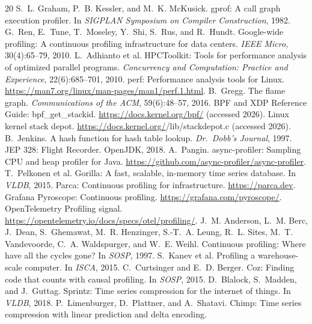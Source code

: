 \documentclass[letterpaper,twocolumn,10pt]{article}
\begin{document}
\begin{thebibliography}{20}\small
{} S.~L. Graham, P.~B. Kessler, and M.~K. McKusick.
gprof: A call graph execution profiler. In \emph{SIGPLAN Symposium on
Compiler Construction}, 1982.
 G.~Ren, E.~Tune, T.~Moseley, Y.~Shi, S.~Rus, and R.~Hundt.
Google-wide profiling: A continuous profiling infrastructure for data
centers. \emph{IEEE Micro}, 30(4):65--79, 2010.
 L.~Adhianto et al. HPCToolkit: Tools for performance
analysis of optimized parallel programs. \emph{Concurrency and
Computation: Practice and Experience}, 22(6):685--701, 2010.
 perf: Performance analysis tools for Linux.
\url{https://man7.org/linux/man-pages/man1/perf.1.html}.
 B.~Gregg. The flame graph.
\emph{Communications of the ACM}, 59(6):48--57, 2016.
 BPF and XDP Reference Guide: bpf\_get\_stackid.
\url{https://docs.kernel.org/bpf/} (accessed 2026).
 Linux kernel stack depot.
\url{https://docs.kernel.org/}/lib/stackdepot.c (accessed 2026).
 B.~Jenkins. A hash function for hash table lookup.
\emph{Dr.~Dobb's Journal}, 1997.
 JEP 328: Flight Recorder. OpenJDK, 2018.
 A.~Pangin. async-profiler: Sampling CPU and heap
profiler for Java. \url{https://github.com/async-profiler/async-profiler}.
 T.~Pelkonen et al. Gorilla: A fast, scalable,
in-memory time series database. In \emph{VLDB}, 2015.
 Parca: Continuous profiling for infrastructure.
\url{https://parca.dev}.
 Grafana Pyroscope: Continuous profiling.
\url{https://grafana.com/pyroscope/}.
 OpenTelemetry Profiling signal.
\url{https://opentelemetry.io/docs/specs/otel/profiling/}.
 J.~M. Anderson, L.~M. Berc, J.~Dean, S.~Ghemawat, M.~R.
Henzinger, S.-T.~A. Leung, R.~L. Sites, M.~T. Vandevoorde, C.~A.
Waldspurger, and W.~E. Weihl. Continuous profiling: Where have all the
cycles gone? In \emph{SOSP}, 1997.
 S.~Kanev et al. Profiling a warehouse-scale computer.
In \emph{ISCA}, 2015.
 C.~Curtsinger and E.~D. Berger. Coz: Finding code that
counts with causal profiling. In \emph{SOSP}, 2015.
 D.~Blalock, S.~Madden, and J.~Guttag. Sprintz: Time
series compression for the internet of things. In \emph{VLDB}, 2018.
 P.~Limenburger, D.~Plattner, and A.~Shatavi. Chimp:
Time series compression with linear prediction and delta encoding.

\end{thebibliography}
\end{document}
